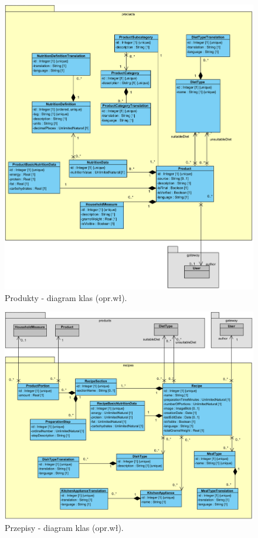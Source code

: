 \begin{minipage}{\textwidth}
    \begin{figure}[H]
        \centering\includegraphics[scale=0.7]{../uml/class_diagrams/products.png}
        \caption{Produkty - diagram klas (opr.wł).}\label{rysunek:class-diagram-products}
    \end{figure}
\end{minipage}

\begin{minipage}{\textwidth}
    \begin{figure}[H]
        \centering\includegraphics[scale=0.7]{../uml/class_diagrams/recipes.png}
        \caption{Przepisy - diagram klas (opr.wł).}\label{rysunek:class-diagram-recipes}
    \end{figure}
\end{minipage}

